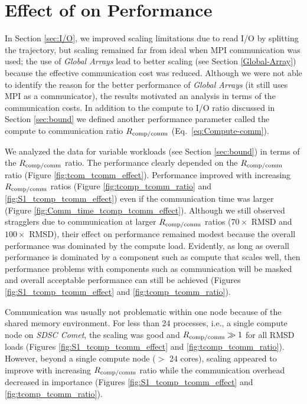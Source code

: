 
\section{Effect of \Rcompcomm on Performance}
\label{sec:tcomm}

In Section \ref{sec:I/O}, we improved scaling limitations due to read I/O by splitting the trajectory, but scaling remained far from ideal when MPI communication was used; the use of \emph{Global Arrays} lead to better scaling (see Section \ref{Global-Array}) because the effective communication cost was reduced.
Although we were not able to identify the reason for the better performance of \emph{Global Arrays} (it still uses MPI as a communicator), the results motivated an analysis in terms of the communication costs.
In addition to the compute to I/O ratio \RcompIO discussed in Section \ref{sec:bound} we defined another performance parameter called the compute to communication ratio $R_{\text{comp/comm}}$ (Eq.~\ref{eq:Compute-comm}).

We analyzed the data for variable workloads (see Section \ref{sec:bound}) in terms of the $R_{\text{comp/comm}}$ ratio.
The performance clearly depended on the $R_{\text{comp/comm}}$ ratio (Figure \ref{fig:tcom_tcomm_effect}).
Performance improved with increasing $R_{\text{comp/comm}}$ ratios (Figure \ref{fig:tcomp_tcomm_ratio} and \ref{fig:S1_tcomp_tcomm_effect}) even if the communication time was larger (Figure \ref{fig:Comm_time_tcomp_tcomm_effect}).
Although we still observed stragglers due to communication at larger $R_{\text{comp/comm}}$ ratios ($70\times$ RMSD and $100\times$ RMSD), their effect on performance remained modest because the overall performance was dominated by the compute load. 
Evidently, as long as overall performance is dominated by a component such as compute that scales well, then performance problems with components such as communication will be masked and overall acceptable performance can still be achieved (Figures \ref{fig:S1_tcomp_tcomm_effect} and \ref{fig:tcomp_tcomm_ratio}).

Communication was usually not problematic within one node because of the shared memory environment.
For less than 24 processes, i.e., a single compute node on \emph{SDSC Comet}, the scaling was good and $R_{\text{comp/comm}} \gg 1$ for all RMSD loads (Figures \ref{fig:S1_tcomp_tcomm_effect} and \ref{fig:tcomp_tcomm_ratio}).
However, beyond a single compute node ($>$ 24 cores), scaling appeared to improve with increasing $R_{\text{comp/comm}}$ ratio while the communication overhead decreased in importance (Figures \ref{fig:S1_tcomp_tcomm_effect} and \ref{fig:tcomp_tcomm_ratio}).

